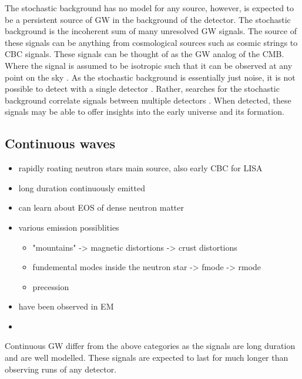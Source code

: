 The stochastic background has no model for any source, however, is expected to be a persistent source of \ac{GW} in the background of the detector. 
The stochastic background is the incoherent sum of many unresolved \ac{GW} signals.
The source of these signals can be anything from cosmological sources such as cosmic strings to \ac{CBC} signals.
These signals can be thought of as the \ac{GW} analog of the \ac{CMB}.
Where the signal is assumed to be isotropic such that it can be observed at any point on the sky \citep{Christensen2018StochasticBackgrounds}. 
As the stochastic background is essentially just noise, it is not possible to detect with a single detector \citep{Christensen2018StochasticBackgrounds}.
Rather, searches for the stochastic background correlate signals between multiple detectors \citep{Romano2019SearchesBackgrounds,Christensen2018StochasticBackgrounds}. 
When detected, these signals may be able to offer insights into the early universe and its formation.



\subsection{Continuous waves}


\begin{itemize}
    \item rapidly roating neutron stars main source, also early CBC for LISA
    \item long duration continuously emitted
    \item can learn about EOS of dense neutron matter
    \item various emission possiblities
    \begin{itemize}
        \item "mountains" -> magnetic distortions -> crust distortions
        \item fundemental modes inside the neutron star -> fmode -> rmode
        \item precession
    \end{itemize}
    \item have been observed in EM
    \item 
\end{itemize}

Continuous \ac{GW} differ from the above categories as the signals are long duration and are well modelled.
These signals are expected to last for much longer than observing runs of any detector. 

